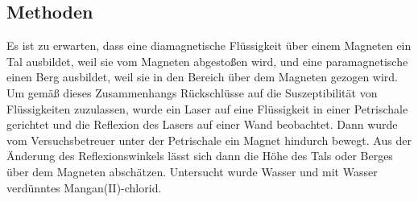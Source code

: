 \documentclass[
	a4paper,
	12pt,
	pagesize,
	ngerman
]{scrartcl}
\begin{document}
	\subsection{Methoden}
	Es ist zu erwarten, dass eine diamagnetische Flüssigkeit über einem Magneten ein Tal ausbildet, weil sie vom Magneten abgestoßen wird, und eine paramagnetische einen Berg ausbildet, weil sie in den Bereich über dem Magneten gezogen wird. %
	Um gemäß dieses Zusammenhangs Rückschlüsse auf die Suszeptibilität von Flüssigkeiten zuzulassen, wurde ein Laser auf eine Flüssigkeit in einer Petrischale gerichtet und die Reflexion des Lasers auf einer Wand beobachtet. Dann wurde vom Versuchsbetreuer unter der Petrischale ein Magnet hindurch bewegt. Aus der Änderung des Reflexionswinkels lässt sich dann die Höhe des Tals oder Berges über dem Magneten abschätzen. Untersucht wurde Wasser und mit Wasser verdünntes Mangan(II)-chlorid.
\end{document}
